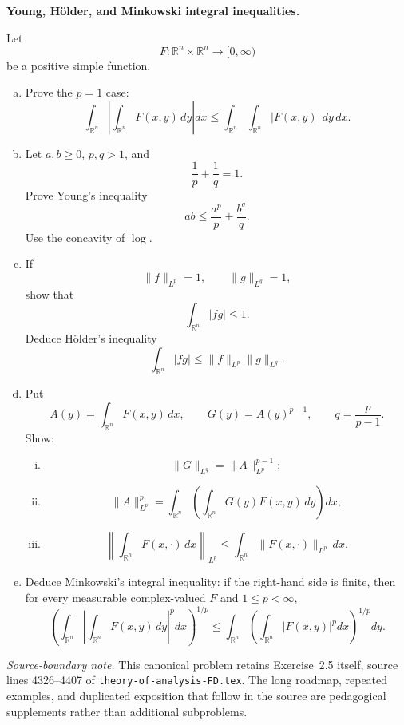 \begin{problem}[CP-III-0016]
\label{prob:cp-iii-0016}
\textbf{Young, Hölder, and Minkowski integral inequalities.}

Let
\[
F:\mathbb R^n\times\mathbb R^n\to[0,\infty)
\]
be a positive simple function.

\begin{enumerate}[(a)]
\item Prove the \(p=1\) case:
\[
\int_{\mathbb R^n}
\left|
\int_{\mathbb R^n}F(x,y)\,dy
\right|dx
\le
\int_{\mathbb R^n}\int_{\mathbb R^n}
|F(x,y)|\,dy\,dx.
\]

\item Let \(a,b\ge0\), \(p,q>1\), and
\[
\frac1p+\frac1q=1.
\]
Prove Young's inequality
\[
ab
\le
\frac{a^p}{p}
+
\frac{b^q}{q}.
\]
Use the concavity of \(\log\).

\item If
\[
\|f\|_{L^p}=1,
\qquad
\|g\|_{L^q}=1,
\]
show that
\[
\int_{\mathbb R^n}|fg|
\le1.
\]
Deduce Hölder's inequality
\[
\int_{\mathbb R^n}|fg|
\le
\|f\|_{L^p}\|g\|_{L^q}.
\]

\item Put
\[
A(y)
=
\int_{\mathbb R^n}F(x,y)\,dx,
\qquad
G(y)=A(y)^{p-1},
\qquad
q=\frac{p}{p-1}.
\]
Show:
\begin{enumerate}[i)]
\item
\[
\|G\|_{L^q}
=
\|A\|_{L^p}^{p-1};
\]
\item
\[
\|A\|_{L^p}^p
=
\int_{\mathbb R^n}
\left(
\int_{\mathbb R^n}
G(y)F(x,y)\,dy
\right)dx;
\]
\item
\[
\left\|
\int_{\mathbb R^n}F(x,\cdot)\,dx
\right\|_{L^p}
\le
\int_{\mathbb R^n}
\|F(x,\cdot)\|_{L^p}\,dx.
\]
\end{enumerate}

\item Deduce Minkowski's integral inequality: if the right-hand side is
finite, then for every measurable complex-valued \(F\) and
\(1\le p<\infty\),
\[
\left(
\int_{\mathbb R^n}
\left|
\int_{\mathbb R^n}F(x,y)\,dy
\right|^pdx
\right)^{1/p}
\le
\int_{\mathbb R^n}
\left(
\int_{\mathbb R^n}|F(x,y)|^pdx
\right)^{1/p}dy.
\]
\end{enumerate}

\medskip
\noindent
\textit{Source-boundary note.}
This canonical problem retains Exercise~2.5 itself, source lines 4326--4407
of \texttt{theory-of-analysis-FD.tex}. The long roadmap, repeated examples,
and duplicated exposition that follow in the source are pedagogical
supplements rather than additional subproblems.
\end{problem}

